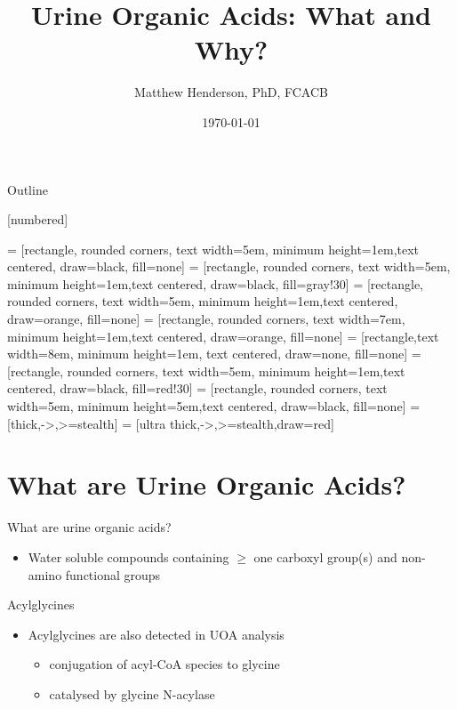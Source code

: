 \documentclass[presentation, smaller]{beamer}
\author{Matthew Henderson, PhD, FCACB}
\date{\today}
\title{Urine Organic Acids: What and Why?}
\institute[NSO]{Newborn Screening Ontario}
\begin{document}
\maketitle
\begin{frame}{Outline}
\tableofcontents
\end{frame}




\vspace{220pt}
\beamertemplatenavigationsymbolsempty
{}[numbered]


 = [rectangle, rounded corners, text width=5em, minimum height=1em,text centered, draw=black, fill=none]
 = [rectangle, rounded corners, text width=5em, minimum height=1em,text centered, draw=black, fill=gray!30]
 = [rectangle, rounded corners, text width=5em, minimum height=1em,text centered, draw=orange, fill=none]
 = [rectangle, rounded corners, text width=7em, minimum height=1em,text centered, draw=orange, fill=none]
 = [rectangle,text width=8em, minimum height=1em, text centered, draw=none, fill=none]
 = [rectangle, rounded corners, text width=5em, minimum height=1em,text centered, draw=black, fill=red!30]
 = [rectangle, rounded corners, text width=5em, minimum height=5em,text centered, draw=black, fill=none]
 = [thick,->,>=stealth]
 = [ultra thick,->,>=stealth,draw=red]

\section{What are Urine Organic Acids?}
\label{sec:orgcdc7f6f}
\begin{frame}[label={sec:orgc41ecd8}]{What are urine organic acids?}
\begin{itemize}
\item Water soluble compounds containing \(\ge\) one carboxyl group(s) and
non-amino functional groups
\end{itemize}


\centering
{}


\begin{block}{Acylglycines}
\begin{itemize}
\item Acylglycines are also detected in UOA analysis
\begin{itemize}
\item conjugation of acyl-CoA species to glycine
\item catalysed by glycine N-acylase
\end{itemize}
\end{itemize}
\end{block}
\end{frame}
\end{document}
